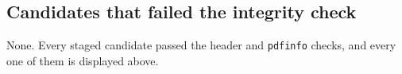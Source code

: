 \FloatBarrier

\subsection*{Candidates that failed the integrity check}

None. Every staged candidate passed the header and \texttt{pdfinfo}
checks, and every one of them is displayed above.

\FloatBarrier

\renewcommand{\thesection}{\thechapter.\arabic{section}}
